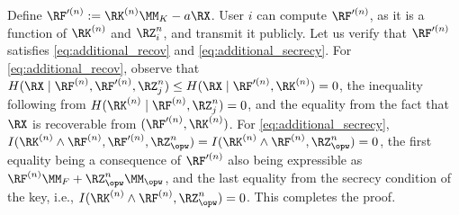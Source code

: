 

Define $\RF'^{(n)}:= \RK^{(n)}\MM_K - a\RX$. User $i$ can compute $\RF'^{(n)}$, as it is a function of  $\RK^{(n)}$ and $\RZ_i^n$, and transmit it publicly. Let us verify that $\RF'^{(n)}$ satisfies \eqref{eq:additional_recov} and \eqref{eq:additional_secrecy}. For \eqref{eq:additional_recov}, observe that  $H(\RX\mid \RF^{(n)},\RF'^{(n)}, \RZ_j^n) \leq H(\RX\mid \RF'^{(n)}, \RK^{(n)})=0$, the inequality following from $H(\RK^{(n)}\mid\RF^{(n)},\RZ_j^n)=0$, and the  equality from the fact that $\RX$ is recoverable from $(\RF'^{(n)}, \RK^{(n)})$. For \eqref{eq:additional_secrecy}, $I(\RK^{(n)}\wedge \RF^{(n)},\RF'^{(n)}, \RZ_{\opw}^n)= I(\RK^{(n)}\wedge \RF^{(n)}, \RZ_{\opw}^n) = 0$,  the first equality being a consequence of $\RF'^{(n)}$ also being expressible as $\RF^{(n)}\MM_{F}+\RZ_{\opw}^n \MM_{\opw}$, and the last equality from the secrecy condition of the key, i.e., $I(\RK^{(n)} \wedge \RF^{(n)},  \RZ_{\opw}^n) = 0$. This completes the proof.



